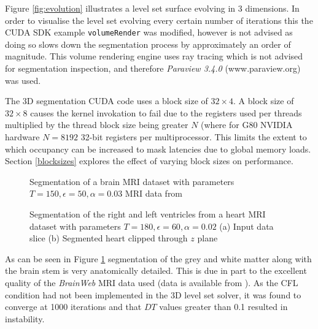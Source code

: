 Figure \ref{fig:evolution} illustrates a level set surface evolving in 3 dimensions. In order to visualise the level set evolving every certain number of iterations this the CUDA SDK example \texttt{volumeRender} was modified, however is not advised as doing so slows down the segmentation process by approximately an order of magnitude. This volume rendering engine uses ray tracing which is not advised for segmentation inspection, and therefore \textit{Paraview 3.4.0} (www.paraview.org) was used.

The 3D segmentation CUDA code uses a block size of $32 \times 4$. A block size of $32 \times 8$ causes the kernel invokation to fail due to the registers used per threads multiplied by the thread block size being greater $N$ (where for G80 NVIDIA hardware $N=8192$ 32-bit registers per multiprocessor. This limits the extent to which occupancy can be increased to mask latencies due to global memory loads. Section \ref{blocksizes} explores the effect of varying block sizes on performance.

\begin{figure}[p]
  \begin{center}
  \end{center}
  \caption{Segmentation of a brain MRI dataset with parameters $T = 150, \epsilon = 50, \alpha = 0.03$ MRI data from \cite{brainweb}}
  \label{fig:brain3d}
\end{figure}
\begin{figure}[p]
  \begin{center}
  \end{center}
  \caption{Segmentation of the right and left ventricles from a heart MRI dataset with parameters $T = 180, \epsilon = 60, \alpha = 0.02$ (a) Input data slice (b) Segmented heart clipped through $z$ plane}
  \label{fig:heart3d}
\end{figure}

As can be seen in Figure \ref{fig:brain3d} segmentation of the grey and white matter along with the brain stem is very anatomically detailed. This is due in part to the excellent quality of the \textit{BrainWeb} MRI data used (data is available from \cite{brainweb}). As the CFL condition had not been implemented in the 3D level set solver, it was found to converge at 1000 iterations and that $DT$ values greater than 0.1 resulted in instability.

